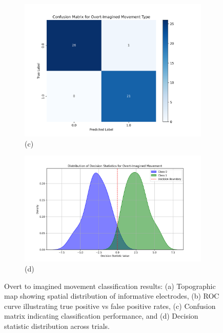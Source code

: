 \documentclass[
  letterpaper,
  DIV=11,
  numbers=noendperiod]{scrartcl}
\begin{document}
\begin{figure}
{\begin{figure}
\centering
\includegraphics[width=1\textwidth,height=\textheight]{figures/cross-validated-results/linear/overt-imagined-confusion-matrix.png}
\caption{(c)}\label{fig:overt-imagined-confusion-matrix}
\end{figure}

\begin{figure}
\centering
\includegraphics[width=1\textwidth,height=\textheight]{figures/cross-validated-results/linear/overt-imagined-decision-statistic.png}
\caption{(d)}\label{fig:overt-imagined-decision-statistic}
\end{figure}

}

\caption{\label{fig-overt-imagined-results}Overt to imagined movement
classification results: (a) Topographic map showing spatial distribution
of informative electrodes, (b) ROC curve illustrating true positive vs
false positive rates, (c) Confusion matrix indicating classification
performance, and (d) Decision statistic distribution across trials.}

\end{figure}%
\end{document}
